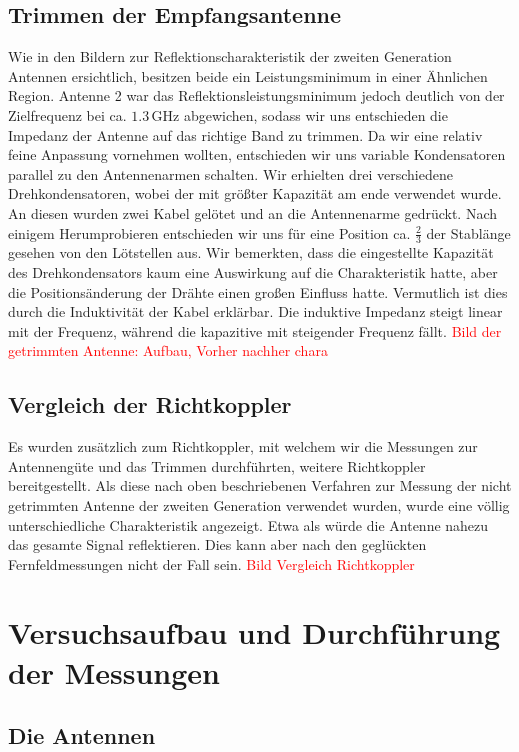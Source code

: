 \documentclass[titlepage,11pt,a4paper,ngerman]{article}
\begin{document}
\subsection{Trimmen der Empfangsantenne}
Wie in den Bildern zur Reflektionscharakteristik der zweiten Generation Antennen ersichtlich, besitzen beide ein Leistungsminimum in einer Ähnlichen Region. Antenne 2 war das Reflektionsleistungsminimum jedoch deutlich von der Zielfrequenz bei ca. $1.3\,$GHz abgewichen, sodass wir uns entschieden die Impedanz der Antenne auf das richtige Band zu trimmen. Da wir eine relativ feine Anpassung vornehmen wollten, entschieden wir uns variable Kondensatoren parallel zu den Antennenarmen schalten. Wir erhielten drei verschiedene Drehkondensatoren, wobei der mit größter Kapazität am ende verwendet wurde. An diesen wurden zwei Kabel gelötet und an die Antennenarme gedrückt. Nach einigem Herumprobieren entschieden wir uns für eine Position ca. $\frac{2}{3}$ der Stablänge gesehen von den Lötstellen aus. Wir bemerkten, dass die eingestellte Kapazität des Drehkondensators kaum eine Auswirkung auf die Charakteristik hatte, aber die Positionsänderung der Drähte einen großen Einfluss hatte. Vermutlich ist dies durch die Induktivität der Kabel erklärbar. Die induktive Impedanz steigt linear mit der Frequenz, während die kapazitive mit steigender Frequenz fällt. 
\textcolor{red}{Bild der getrimmten Antenne: Aufbau, Vorher nachher chara}

\subsection{Vergleich der Richtkoppler}
Es wurden zusätzlich zum Richtkoppler, mit welchem wir die Messungen zur Antennengüte und das Trimmen durchführten, weitere Richtkoppler bereitgestellt. Als diese nach oben beschriebenen Verfahren zur Messung der nicht getrimmten Antenne der zweiten Generation verwendet wurden, wurde eine völlig unterschiedliche Charakteristik angezeigt. Etwa als würde die Antenne nahezu das gesamte Signal reflektieren. Dies kann aber nach den geglückten Fernfeldmessungen nicht der Fall sein.
\textcolor{red}{Bild Vergleich Richtkoppler}

\section{Versuchsaufbau und Durchführung der Messungen}
\label{Versuchsaufbau} 

\subsection{Die Antennen}
\end{document}
